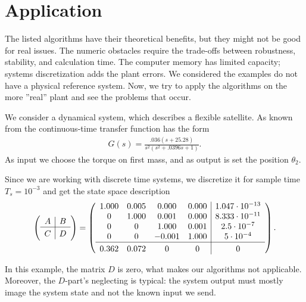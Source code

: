 \chapter{Application}

The listed algorithms have their theoretical benefits, but they might not be good for real issues. The numeric obstacles require the trade-offs between robustness, stability, and calculation time. The computer memory has limited capacity; systems discretization adds the plant errors. We considered the examples do not have a physical reference system. Now, we try to apply the algorithms on the more ''real'' plant and see the problems that occur. 



	\begin{exam}
		 We consider a dynamical system, which describes a flexible satellite. As known from \cite{SchRC} the continuous-time transfer function has the form  
		\begin{align}
		G(s) = \frac{.036(s + 25.28)}{s^2(s^2 + .0396s + 1)}. 
		\end{align}
		As input we choose the torque on first mass, and as output is set the position $\theta_2$. 
		
		Since we are working with discrete time systems, we discretize it for sample time $T_s = 10^{-3}$  and get the state space description 
		\begin{align}
		\label{eq:Appl:satellite_sys}
		\left( \begin{array}{c | c}
		A & B \\ \hline C & D
		\end{array}\right) = 
		\left(\begin{array}{c c c c | c}
	    1.000  &  0.005  &  0.000  &  0.000 & 1.047\cdot 10^{-13}\\
		0  &  1.000  &  0.001  &  0.000 & 8.333\cdot 10^{-11}\\
		0  &       0  &  1.000  &  0.001 & 2.5\cdot 10^{-7}\\
		0  &       0  & -0.001  &  1.000 & 5\cdot 10^{-4}\\ \hline
        0.362 & 0.072&  0 & 0 & 0
		\end{array}\right). 
	\end{align}
	\end{exam}

In this example, the matrix $D$ is zero, what makes our algorithms not applicable. 
Moreover, the  $D$-part's neglecting is typical: the system output must mostly image the system state and not the known input we send. 

